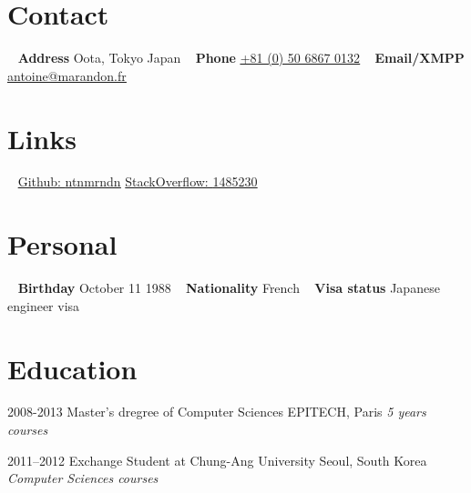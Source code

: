 \documentclass[]{template/friggeri-cv} %
\begin{document}


\begin{aside} %
\section{Contact}
~
\textbf{Address}
Oota, Tokyo
Japan
~
\textbf{Phone}
\href{tel:00815068670132}{\underline{+81 (0) 50 6867 0132}}
~
\textbf{Email/XMPP}
\href{mailto:antoine@marandon.fr}{\underline{antoine@marandon.fr}}
\section {Links}
~
\href{https://github.com/ntnmrndn}{Github: \underline{ntnmrndn}}
\href{http://stackoverflow.com/users/1485230/}{StackOverflow: \underline{1485230}}
\section{Personal}
~
\textbf{Birthday}
October 11 1988
~
\textbf{Nationality}
French
~
\textbf{Visa status}
Japanese engineer visa
\end{aside}


\section{Education}

\begin{entrylist}


\entry
{2008-2013}
{Master's dregree {\normalfont of Computer Sciences}}
{EPITECH, Paris}
{\emph{5 years courses}}


\entry
{2011--2012}
{Exchange Student {\normalfont at Chung-Ang University}}
{Seoul, South Korea}
{\emph{Computer Sciences courses}}


\end{entrylist}
\end{document}
